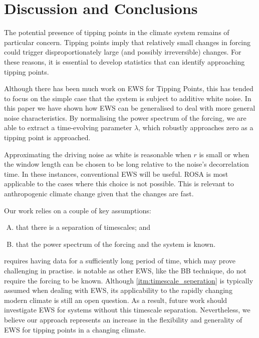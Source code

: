 \section{Discussion and Conclusions}
The potential presence of tipping points in the climate system remains of particular concern. 
Tipping points imply that relatively small changes in forcing could trigger
disproportionately large (and possibly irreversible) changes.
For these reasons, it is essential to develop
statistics that can identify approaching tipping points.

Although there has been much work on EWS for Tipping Points,
this has tended to focus on the simple case that the system is subject to additive white noise. 
In this paper we have shown how EWS can be generalised to deal with more general noise characteristics. By normalising the power spectrum of the forcing, we are able to extract a 
time-evolving parameter $\lambda$, which robustly approaches zero as a tipping point is approached.  

Approximating the driving noise as white is reasonable when $r$ is 
small or when the window length can be chosen to be long relative to the 
noise's decorrelation time. In these instances, conventional EWS will be useful. ROSA is most applicable to the cases where this choice is not
possible. This is relevant to anthropogenic climate change given that the changes are fast.

Our work relies on a couple of  key assumptions:
\begin{enumerate}[A.]
\item \label{itm:timescale_seperation} that there is a separation of timescales; and
\item \label{itm:exists} that the power spectrum of the forcing and the system is known.
\end{enumerate}
 requires having data for a sufficiently long period of time, which may 
prove challenging in practise.  is notable as other EWS, like the BB technique, do not require the forcing to be known.
Although \cref{itm:timescale_seperation} is typically assumed when dealing with EWS, its applicability
to the rapidly changing modern climate is still an open question.
As a result, future work should investigate EWS for systems without this timescale separation.
Nevertheless, we believe our approach represents an increase in the flexibility and generality of EWS for tipping points in a changing climate.

